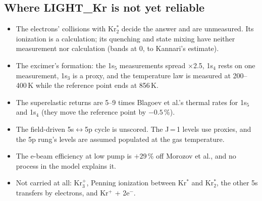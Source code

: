 \documentclass[11pt]{article}
\newcommand{\el}{\ensuremath{\mathrm{e}^-}}
\newcommand{\Krs}{Kr\ensuremath{^*}}
\newcommand{\Krts}{Kr\ensuremath{_2^*}}
\newcommand{\x}{\ensuremath{\times}}
\begin{document}
\subsection{Where LIGHT\_Kr is not yet reliable}
\begin{itemize}
\item The electrons' collisions with \Krts{} decide the answer and are
  unmeasured. Its ionization is a calculation; its quenching and state
  mixing have neither measurement nor calculation (bands at 0, to Kannari's
  estimate).
\item The excimer's formation: the 1s$_5$ measurements spread \x2.5, 1s$_4$
  rests on one measurement, 1s$_3$ is a proxy, and the temperature law is
  measured at 200--400\,K while the reference point ends at 856\,K.
\item The superelastic returns are 5--9 times Blagoev et al.'s thermal
  rates for 1s$_5$ and 1s$_4$ (they move the reference point by $-0.5$\,\%).
\item The field-driven 5s$\leftrightarrow$5p cycle is unscored. The J\,=\,1
  levels use proxies, and the 5p rung's levels are assumed populated at the
  gas temperature.
\item The e-beam efficiency at low pump is $+29$\,\% off Morozov et al., and
  no process in the model explains it.
\item Not carried at all: Kr$_3^+$, Penning ionization between \Krs{} and
  \Krts{}, the other 5s transfers by electrons, and Kr$^+$ + 2\el{}.
\end{itemize}

\appendix
\newcommand{\ratehead}{%
  \toprule
  row & reaction & rate law & $k$, $T_e$\,=\,1\,eV & $k$, $T_e$\,=\,3\,eV & unit & bands & source (excerpt) \\
  \midrule}
\newcommand{\bandhead}{%
  \toprule
  band & rate & default & range & unit & rows that read it \\
  \midrule}
\end{document}
